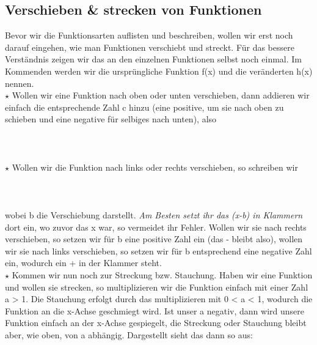 \subsection{Verschieben \& strecken von Funktionen}
	Bevor wir die Funktionsarten auflisten und beschreiben, wollen wir erst noch
	darauf eingehen, wie man Funktionen verschiebt und streckt. Für das bessere
	Verständnis zeigen wir das an den einzelnen Funktionen selbst noch einmal. Im
	Kommenden werden wir die ursprüngliche Funktion f(x) und die veränderten h(x)
	nennen.\\

	\(\star\) Wollen wir eine Funktion nach oben oder unten verschieben, dann
	addieren wir einfach die entsprechende Zahl c hinzu (eine positive, um sie nach
	oben zu schieben und eine negative für selbiges nach unten), also
	\\ \\
	\formel{\[h_1(x)=f(x)+c\]}
	\\ \\
	\(\star\) Wollen wir die Funktion nach links oder rechts verschieben, so
	schreiben wir
	\\ \\
	\formel{\[h_2(x)=f(x-b)\]}
	\\ \\
	wobei b die Verschiebung darstellt. \textit{Am Besten setzt ihr das (x-b) in
	Klammern} dort ein, wo zuvor das x war, so vermeidet ihr Fehler. Wollen wir sie
	nach rechts verschieben, so setzen wir für b eine positive Zahl ein (das -
	bleibt also), wollen wir sie nach links verschieben, so setzen wir für b
	entsprechend eine negative Zahl ein, wodurch ein + in der Klammer steht.\\

	\(\star\) Kommen wir nun noch zur Streckung bzw. Stauchung. Haben wir eine
	Funktion und wollen sie strecken, so multiplizieren wir die Funktion einfach
	mit einer Zahl a > 1. Die Stauchung erfolgt durch das multiplizieren mit 0
	< a < 1, wodurch die Funktion an die x-Achse geschmiegt wird. Ist unser a
	negativ, dann wird unsere Funktion einfach an der x-Achse gespiegelt, die Streckung oder
	Stauchung bleibt aber, wie oben, von a abhängig. Dargestellt sieht das dann so
	aus:
	\\ \\
	\formel{\[h_3(x)=a\cdot f(x)\]}
